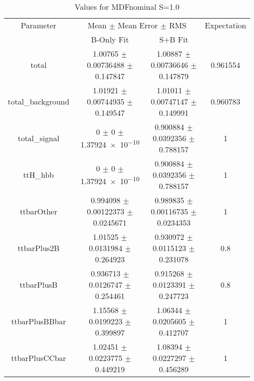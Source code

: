 \begin{table}
\centering
\caption{Values for MDFnominal S=1.0}
\begin{tabular}{cccc}
\toprule
Parameter & \multicolumn{2}{c}{Mean $\pm$ Mean Error $\pm$ RMS} & Expectation\\
 & B-Only Fit & S+B Fit & \\
\midrule
total & \num{1.00765} $\pm$ \num{0.00736488} $\pm$ \num{0.147847} & \num{1.00887} $\pm$ \num{0.00736646} $\pm$ \num{0.147879} & \num{0.961554}\\
total\_background & \num{1.01921} $\pm$ \num{0.00744935} $\pm$ \num{0.149547} & \num{1.01011} $\pm$ \num{0.00747147} $\pm$ \num{0.149991} & \num{0.960783}\\
total\_signal & \num{0} $\pm$ \num{0} $\pm$ \num{1.37924e-10} & \num{0.900884} $\pm$ \num{0.0392356} $\pm$ \num{0.788157} & \num{1}\\
ttH\_hbb & \num{0} $\pm$ \num{0} $\pm$ \num{1.37924e-10} & \num{0.900884} $\pm$ \num{0.0392356} $\pm$ \num{0.788157} & \num{1}\\
ttbarOther & \num{0.994098} $\pm$ \num{0.00122373} $\pm$ \num{0.0245671} & \num{0.989835} $\pm$ \num{0.00116735} $\pm$ \num{0.0234353} & \num{1}\\
ttbarPlus2B & \num{1.01525} $\pm$ \num{0.0131984} $\pm$ \num{0.264923} & \num{0.930972} $\pm$ \num{0.0115123} $\pm$ \num{0.231078} & \num{0.8}\\
ttbarPlusB & \num{0.936713} $\pm$ \num{0.0126747} $\pm$ \num{0.254461} & \num{0.915268} $\pm$ \num{0.0123391} $\pm$ \num{0.247723} & \num{0.8}\\
ttbarPlusBBbar & \num{1.15568} $\pm$ \num{0.0199223} $\pm$ \num{0.399897} & \num{1.06344} $\pm$ \num{0.0205605} $\pm$ \num{0.412707} & \num{1}\\
ttbarPlusCCbar & \num{1.02451} $\pm$ \num{0.0223775} $\pm$ \num{0.449219} & \num{1.08394} $\pm$ \num{0.0227297} $\pm$ \num{0.456289} & \num{1}\\
\bottomrule
\end{tabular}
\end{table}